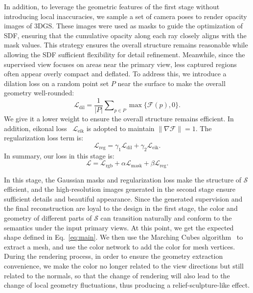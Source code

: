 In addition, to leverage the geometric features of the first stage without introducing local inaccuracies, we sample a set of camera poses to render opacity images of 3DGS. These images were used as masks to guide the optimization of SDF, ensuring that the cumulative opacity along each ray closely aligns with the mask values. This strategy ensures the overall structure remains reasonable while allowing the SDF sufficient flexibility for detail refinement. Meanwhile, since the supervised view focuses on areas near the primary view, less captured regions often appear overly compact and deflated. To address this, we introduce a dilation loss on a random point set $P$ near the surface to make the overall geometry well-rounded:
\begin{equation}	
\mathcal{L}_{\mathrm{dil}} = \frac{1}{|P|} \sum\nolimits_{p \in P} \max\{\mathcal{F}(p), 0\}.
\end{equation}
We give it a lower weight to ensure the overall structure remains efficient. In addition, eikonal loss~\cite{igr} $\mathcal{L}_{\mathrm{eik}}$ is adopted to maintain $\|\nabla \mathcal{F}\|=1$. The regularization loss term is:
\begin{equation}
	\mathcal{L}_{\mathrm{reg}} = \gamma_1\mathcal{L}_{\mathrm{dil}} + \gamma_2\mathcal{L}_{\mathrm{eik}}.
\end{equation}
In summary, our loss in this stage is:
\begin{equation}
	\mathcal{L} = \mathcal{L}_{\mathrm{rgb}} + \alpha \mathcal{L}_{\mathrm{mask}} + \beta \mathcal{L}_{\mathrm{reg}}.
\end{equation}

In this stage, the Gaussian masks and regularization loss make the structure of $\mathcal{S}$ efficient, and the high-resolution images generated in the second stage ensure sufficient details and beautiful appearance. Since the generated supervision and the final reconstruction are loyal to the design in the first stage, the color and geometry of different parts of $\mathcal{S}$ can transition naturally and conform to the semantics under the input primary views. At this point, we get the expected shape defined in Eq.~\eqref{eq:main}. We then use the Marching Cubes algorithm~\cite{marchingcubes} to extract a mesh, and use the color network to add the color for mesh vertices. During the rendering process, in order to ensure the geometry extraction convenience, we make the color no longer related to the view directions but still related to the normals, so that the change of rendering will also lead to the change of local geometry fluctuations, thus producing a relief-sculpture-like effect. 